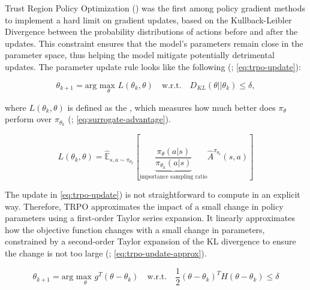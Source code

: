             \bigskip
            
            \noindent Trust Region Policy Optimization (\textcolor{deepblue}{\cite{schulman2017trust}}) was the first among policy gradient methods to implement a hard limit on gradient updates, based on the Kullback-Leibler Divergence between the probability distributions of actions before and after the updates. This constraint ensures that the model's parameters remain close in the parameter space, thus helping the model mitigate potentially detrimental updates. The parameter update rule looks like the following (\textcolor{deepblue}{\cite{schulman2017trust}; \autoref{eq:trpo-update}}):
            
            \begin{equation}
                \theta_{k+1} = \text{arg }\underset{\theta}{\text{max }} L(\theta_k, \theta) \quad \text{w.r.t.} \quad D_{KL}(\theta || \theta_k) \leq \delta,
                \label{eq:trpo-update}
            \end{equation}
            
            \noindent where $L(\theta_k, \theta)$ is defined as the , which measures how much better does $\pi_{\theta}$ perform over $\pi_{\theta_k}$ (\textcolor{deepblue}{\cite{schulman2017trust}; \autoref{eq:surrogate-advantage}}).
            
            \begin{equation}
                L(\theta_k, \theta) = \mathbb{\hat{E}}_{s, a \sim \pi_{\theta_k}} \left [ \underbrace{\frac{\pi_{\theta}(a | s)}{\pi_{\theta_k}(a | s)}}_{\text{importance sampling ratio}} \hat{A}^{\pi_{\theta_k}}(s, a)\right]
                \label{eq:surrogate-advantage}
            \end{equation}
            
            \noindent The update in \textcolor{deepblue}{\autoref{eq:trpo-update}}) is not straightforward to compute in an explicit way. Therefore, TRPO approximates the impact of a small change in policy parameters using a first-order Taylor series expansion. It linearly approximates how the objective function changes with a small change in parameters, constrained by a second-order Taylor expansion of the KL divergence to ensure the change is not too large (\textcolor{deepblue}{\cite{schulman2017trust}; \autoref{eq:trpo-update-approx}}).
            
            \begin{equation}
                \theta_{k+1} = \text{arg }\underset{\theta}{\text{max }} g^T(\theta - \theta_k) \quad \text{w.r.t.} \quad \frac{1}{2}(\theta - \theta_k)^T H(\theta - \theta_k) \leq \delta
                \label{eq:trpo-update-approx}
            \end{equation}
            
